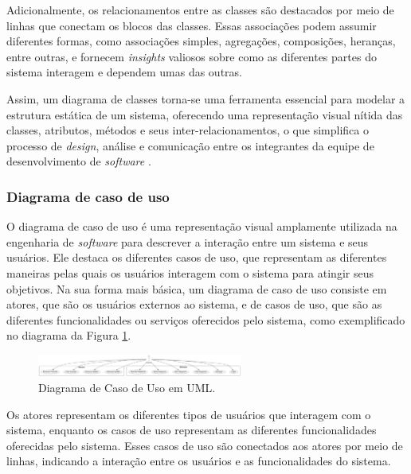 Adicionalmente, os relacionamentos entre as classes são destacados por meio de linhas que conectam os blocos das classes. Essas associações podem assumir diferentes formas, como associações simples, agregações, composições, heranças, entre outras, e fornecem \textit{insights} valiosos sobre como as diferentes partes do sistema interagem e dependem umas das outras.
            
Assim, um diagrama de classes torna-se uma ferramenta essencial para modelar a estrutura estática de um sistema, oferecendo uma representação visual nítida das classes, atributos, métodos e seus inter-relacionamentos, o que simplifica o processo de \textit{design}, análise e comunicação entre os integrantes da equipe de desenvolvimento de \textit{software} \cite{softwareenguml}.
            
\subsubsection{Diagrama de caso de uso}
        
O diagrama de caso de uso é uma representação visual amplamente utilizada na engenharia de \textit{software} para descrever a interação entre um sistema e seus usuários. Ele destaca os diferentes casos de uso, que representam as diferentes maneiras pelas quais os usuários interagem com o sistema para atingir seus objetivos. Na sua forma mais básica, um diagrama de caso de uso consiste em atores, que são os usuários externos ao sistema, e de casos de uso, que são as diferentes funcionalidades ou serviços oferecidos pelo sistema, como exemplificado no diagrama da Figura \ref{fig:UseCaseDiagram}.
        
\begin{figure}[htb]
    \caption{\label{fig:UseCaseDiagram}Diagrama de Caso de Uso em UML.}
    \begin{center}
        \includegraphics[width=0.6\textwidth]{figuras/UseCaseDiagram.png}
    \end{center}
\end{figure}
        
Os atores representam os diferentes tipos de usuários que interagem com o sistema, enquanto os casos de uso representam as diferentes funcionalidades oferecidas pelo sistema. Esses casos de uso são conectados aos atores por meio de linhas, indicando a interação entre os usuários e as funcionalidades do sistema.
        
